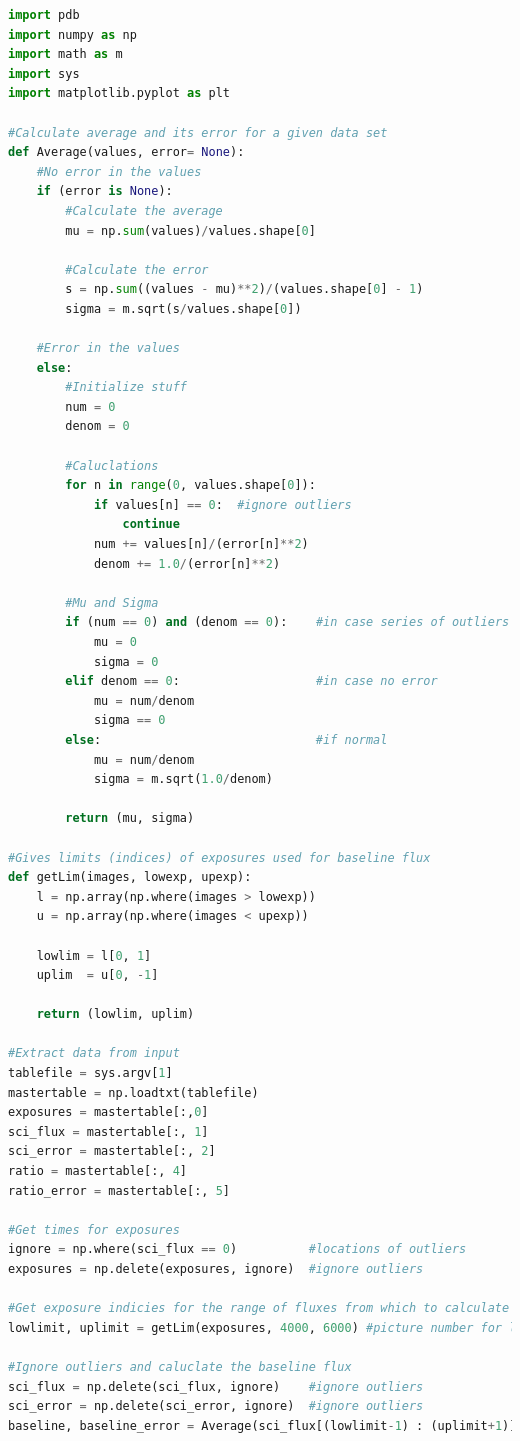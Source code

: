 \documentclass{aastex61}
\begin{document}
\begin{lstlisting}[language = Python, caption= Plots the lightcurve for our transit]
import pdb
import numpy as np
import math as m
import sys
import matplotlib.pyplot as plt

#Calculate average and its error for a given data set
def Average(values, error= None):
	#No error in the values
	if (error is None):
		#Calculate the average
		mu = np.sum(values)/values.shape[0]
		
		#Calculate the error
		s = np.sum((values - mu)**2)/(values.shape[0] - 1)
		sigma = m.sqrt(s/values.shape[0])
		
	#Error in the values
	else:
		#Initialize stuff
		num = 0
		denom = 0
		
		#Caluclations
		for n in range(0, values.shape[0]):
			if values[n] == 0:  #ignore outliers
				continue
			num += values[n]/(error[n]**2)
			denom += 1.0/(error[n]**2)
		
		#Mu and Sigma 
		if (num == 0) and (denom == 0):    #in case series of outliers
			mu = 0
			sigma = 0
		elif denom == 0:                   #in case no error
			mu = num/denom
			sigma == 0                
		else:                              #if normal
			mu = num/denom
			sigma = m.sqrt(1.0/denom)
			
		return (mu, sigma)
		
#Gives limits (indices) of exposures used for baseline flux
def getLim(images, lowexp, upexp):
	l = np.array(np.where(images > lowexp))
	u = np.array(np.where(images < upexp))
	
	lowlim = l[0, 1]
	uplim  = u[0, -1]
	
	return (lowlim, uplim)

#Extract data from input
tablefile = sys.argv[1]
mastertable = np.loadtxt(tablefile)
exposures = mastertable[:,0]
sci_flux = mastertable[:, 1]
sci_error = mastertable[:, 2]
ratio = mastertable[:, 4]
ratio_error = mastertable[:, 5]

#Get times for exposures
ignore = np.where(sci_flux == 0)          #locations of outliers
exposures = np.delete(exposures, ignore)  #ignore outliers

#Get exposure indicies for the range of fluxes from which to calculate baseline flux
lowlimit, uplimit = getLim(exposures, 4000, 6000) #picture number for lower limit of fluxes used for baseline

#Ignore outliers and caluclate the baseline flux
sci_flux = np.delete(sci_flux, ignore)    #ignore outliers
sci_error = np.delete(sci_error, ignore)  #ignore outliers
baseline, baseline_error = Average(sci_flux[(lowlimit-1) : (uplimit+1)], sci_error[(lowlimit-1) : (uplimit+1)])


\end{lstlisting}
\end{document}

